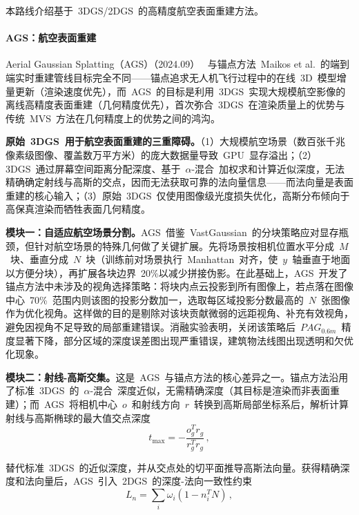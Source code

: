本路线介绍基于~3DGS/2DGS~的高精度航空表面重建方法。

\paragraph{AGS：航空表面重建}

Aerial Gaussian Splatting（AGS）（2024.09）~\cite{2409_00381} 与锚点方法~Maikos et al.~的端到端实时重建管线目标完全不同——锚点追求无人机飞行过程中的在线~3D~模型增量更新（渲染速度优先），而~AGS~的目标是利用~3DGS~实现大规模航空影像的离线高精度表面重建（几何精度优先），首次弥合~3DGS~在渲染质量上的优势与传统~MVS~方法在几何精度上的优势之间的鸿沟。

\textbf{原始~3DGS~用于航空表面重建的三重障碍。}（1）大规模航空场景（数百张千兆像素级图像、覆盖数万平方米）的庞大数据量导致~GPU~显存溢出；（2）3DGS~通过屏幕空间距离分配深度、基于~$\alpha$-混合~加权求和计算近似深度，无法精确确定射线与高斯的交点，因而无法获取可靠的法向量信息——而法向量是表面重建的核心输入；（3）原始~3DGS~仅使用图像级光度损失优化，高斯分布倾向于高保真渲染而牺牲表面几何精度。

\textbf{模块一：自适应航空场景分割。}AGS~借鉴~VastGaussian~的分块策略应对显存瓶颈，但针对航空场景的特殊几何做了关键扩展。先将场景按相机位置水平分成~$M$~块、垂直分成~$N$~块（训练前对场景执行~Manhattan~对齐，使~$y$~轴垂直于地面以方便分块），再扩展各块边界~20\%以减少拼接伪影。在此基础上，AGS~开发了锚点方法中未涉及的视角选择策略：将块内点云投影到所有图像上，若点落在图像中心~70\%~范围内则该图的投影分数加一，选取每区域投影分数最高的~$N$~张图像作为优化视角。这样做的目的是剔除对该块贡献微弱的远距视角、补充有效视角，避免因视角不足导致的局部重建错误。消融实验表明，关闭该策略后~$PAG_{0.6m}$~精度显著下降，部分区域的深度误差图出现严重错误，建筑物法线图出现透明和欠优化现象。

\textbf{模块二：射线-高斯交集。}这是~AGS~与锚点方法的核心差异之一。锚点方法沿用了标准~3DGS~的~$\alpha$-混合~深度近似，无需精确深度（其目标是渲染而非表面重建）；而~AGS~将相机中心~$o$~和射线方向~$r$~转换到高斯局部坐标系后，解析计算射线与高斯椭球的最大值交点深度
\begin{equation}
t_{\text{max}} = -\frac{o_{g}^{T}r_{g}}{r_{g}^{T}r_{g}}\,,
\end{equation}

替代标准~3DGS~的近似深度，并从交点处的切平面推导高斯法向量。获得精确深度和法向量后，AGS~引入~2DGS~的深度-法向一致性约束
\begin{equation}
L_n = \sum_i \omega_i (1 - n_i^T N)\,,
\end{equation}


